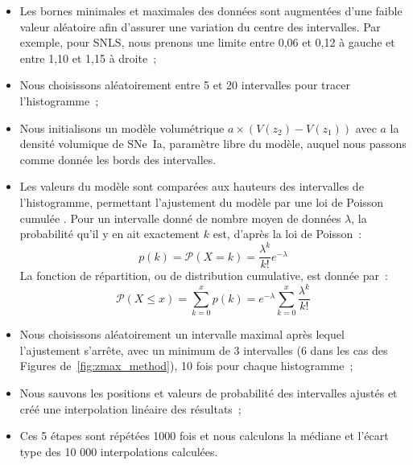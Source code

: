 \documentclass[../main/main.tex]{subfiles}
\begin{document}
\begin{itemize}
    \item Les bornes minimales et maximales des données sont augmentées d'une
        faible valeur aléatoire afin d'assurer une variation du centre des
        intervalles. Par exemple, pour SNLS, nous prenons une limite entre 0,06
        et 0,12 à gauche et entre 1,10 et 1,15 à droite~;
    \item Nous choisissons aléatoirement entre 5 et 20 intervalles pour tracer
        l'histogramme~;
    \item Nous initialisons un modèle volumétrique $a\times
        \left(V(z_2)-V(z_1)\right)$ avec $a$ la densité volumique de SNe~Ia,
        paramètre libre du modèle, auquel nous passons comme donnée les bords
        des intervalles.
    \item Les valeurs du modèle sont comparées aux hauteurs des intervalles de
        l'histogramme, permettant l'ajustement du modèle par une loi de Poisson
        cumulée \citep[voir par exemple][]{syed2015}. Pour un intervalle donné
        de nombre moyen de données $\lambda$, la probabilité qu'il y en ait
        exactement $k$ est, d'après la loi de Poisson~:
        \begin{equation}\label{eq:poisson}
            p(k) = \mathcal{P}(X = k) = \frac{\lambda^k}{k!}e^{-\lambda}
        \end{equation}
        La fonction de répartition, ou de distribution cumulative, est donnée
        par~:
        \begin{equation}\label{eq:pcdf}
            \mathcal{P}(X\leq x) = \sum_{k=0}^{x}p(k) = e^{-\lambda}
            \sum_{k=0}^{x} \frac{\lambda^k}{k!}
        \end{equation}
    \item Nous choisissons aléatoirement un intervalle maximal après lequel
        l'ajustement s'arrête, avec un minimum de 3 intervalles (6 dans les cas
        des Figures de~\ref{fig:zmax_method}), 10 fois pour chaque histogramme~;
    \item Nous sauvons les positions et valeurs de probabilité des intervalles
        ajustés et créé une interpolation linéaire des résultats~;
    \item Ces 5 étapes sont répétées 1000 fois et nous calculons la médiane et
        l'écart type des 10 000 interpolations calculées.
\end{itemize}
\end{document}
